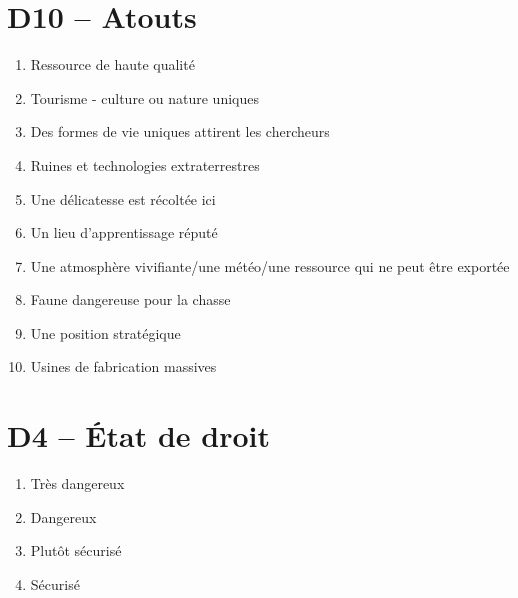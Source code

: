 \documentclass{article}
\begin{document}
\begin{multicols}{2}
	\section*{D10 -- Atouts}
	\begin{enumerate}
		\item Ressource de haute qualité 
		\item Tourisme - culture ou nature uniques
		\item Des formes de vie uniques attirent les chercheurs
		\item Ruines et technologies extraterrestres
		\item Une délicatesse est récoltée ici
		\item Un lieu d'apprentissage réputé
		\item Une atmosphère vivifiante/une météo/une ressource qui ne peut être exportée 
		\item Faune dangereuse pour la chasse
		\item Une position stratégique
		\item Usines de fabrication massives
	\end{enumerate}
	\section*{D4 -- État de droit}
	\begin{enumerate}
		\item Très dangereux
		\item Dangereux
		\item Plutôt sécurisé
		\item Sécurisé
	\end{enumerate}

\end{multicols}
\end{document}
